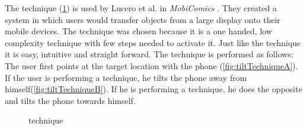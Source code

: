 The \tilt technique (\cref{fig:tiltTechnique}) is used by Lucero et al. in \emph{MobiComics} \cite{Lucero:2012}.
They created a system in which users would transfer objects from a large display onto their mobile devices.
The \throw technique was chosen because it is a one handed, low complexity technique with few steps needed to activate it. 
Just like the \swipe technique it is easy, intuitive and straight forward. 
The \tilt technique is performed as follows:
The user first points at the target location with the phone (\cref{fig:tiltTechniqueA}).
If the user is performing a \push technique, he tilts the phone away from himself(\cref{fig:tiltTechniqueB}).
If he is performing a \pull technique, he does the opposite and tilts the phone towards himself. 

\begin{figure}[H]
	\caption{\push \tilt technique}
	\label{fig:tiltTechnique}
\end{figure}

